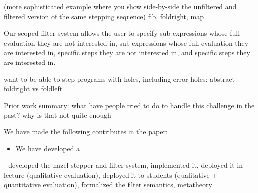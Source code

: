 (more sophisticated example where you show side-by-side the unfiltered and
filtered version of the same stepping sequence) fib, foldright, map

Our scoped filter system allows the user to specify sub-expressions whose full
evaluation they are not interested in, sub-expressions whose full evaluation
they are interested in, specific steps they are not interested in, and specific
steps they are interested in.

want to be able to step programs with holes, including error holes:
abstract foldright vs foldleft

Prior work summary: what have people tried to do to handle this challenge in the past? why is that not quite enough


We have made the following contributes in the paper:
\begin{itemize}
  \item We have developed a 
\end{itemize}

- developed the hazel stepper and filter system, implemented it, deployed it in lecture (qualitative evaluation), deployed it to students (qualitative + quantitative evaluation), formalized the filter semantics, metatheory
